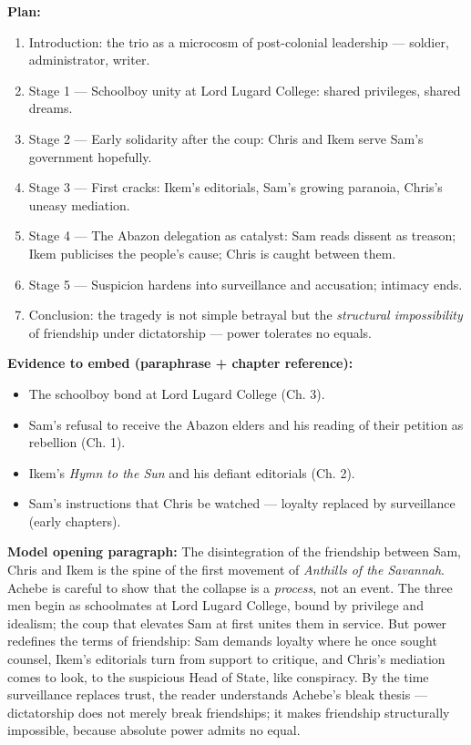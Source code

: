 \documentclass[11pt]{article}
\begin{document}
\begin{exoresolu}
\textbf{Plan:}
\begin{enumerate}
\item Introduction: the trio as a microcosm of post-colonial leadership — soldier, administrator, writer.
\item Stage 1 — Schoolboy unity at Lord Lugard College: shared privileges, shared dreams.
\item Stage 2 — Early solidarity after the coup: Chris and Ikem serve Sam’s government hopefully.
\item Stage 3 — First cracks: Ikem’s editorials, Sam’s growing paranoia, Chris’s uneasy mediation.
\item Stage 4 — The Abazon delegation as catalyst: Sam reads dissent as treason; Ikem publicises the people’s cause; Chris is caught between them.
\item Stage 5 — Suspicion hardens into surveillance and accusation; intimacy ends.
\item Conclusion: the tragedy is not simple betrayal but the \emph{structural impossibility} of friendship under dictatorship — power tolerates no equals.
\end{enumerate}

\textbf{Evidence to embed (paraphrase + chapter reference):}
\begin{itemize}
\item The schoolboy bond at Lord Lugard College (Ch. 3).
\item Sam’s refusal to receive the Abazon elders and his reading of their petition as rebellion (Ch. 1).
\item Ikem’s \emph{Hymn to the Sun} and his defiant editorials (Ch. 2).
\item Sam’s instructions that Chris be watched — loyalty replaced by surveillance (early chapters).
\end{itemize}
\tcblower
\textbf{Model opening paragraph:} The disintegration of the friendship between Sam, Chris and Ikem is the spine of the first movement of \emph{Anthills of the Savannah}. Achebe is careful to show that the collapse is a \emph{process}, not an event. The three men begin as schoolmates at Lord Lugard College, bound by privilege and idealism; the coup that elevates Sam at first unites them in service. But power redefines the terms of friendship: Sam demands loyalty where he once sought counsel, Ikem’s editorials turn from support to critique, and Chris’s mediation comes to look, to the suspicious Head of State, like conspiracy. By the time surveillance replaces trust, the reader understands Achebe’s bleak thesis — dictatorship does not merely break friendships; it makes friendship structurally impossible, because absolute power admits no equal.
\end{exoresolu}
\end{document}
